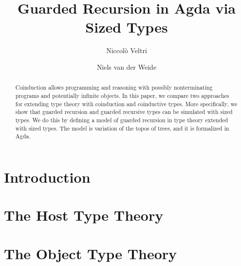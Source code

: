 \documentclass[a4paper,UKenglish,cleveref, autoref,numberwithinsect]{lipics-v2019}
\title{Guarded Recursion in Agda via Sized Types}
\author{Niccol\`o Veltri}{Department of Computer Science, IT
  University of Copenhagen, Denmark}{nive@itu.dk}{https://orcid.org/0000-0002-7230-3436}{This work was supported by a research grant (13156) from VILLUM FONDEN,
  and by DFF-Research Project 1 Grant no. 4002-00442, from The Danish Council 
  for Independent Research for the Natural Sciences (FNU).}
\author{Niels van der Weide}{Institute for Computation and Information Sciences, Radboud University, Nijmegen, The Netherlands}{nweide@cs.ru.nl}{https://orcid.org/0000-0003-1146-4161}{}
\begin{document}
\maketitle

\begin{abstract}
Coinduction allows programming and reasoning with possibly nonterminating programs and potentially infinite objects.
In this paper, we compare two approaches for extending type theory with coinduction and coinductive types.
More specifically, we show that guarded recursion and guarded recursive types can be simulated with sized types.
We do this by defining a model of guarded recursion in type theory extended with sized types.
The model is variation of the topos of trees, and it is formalized in Agda.
\end{abstract}

\section{Introduction}
\label{sec:intro}


\section{The Host Type Theory}
\label{sec:prelim}



\section{The Object Type Theory}
\label{sec:syntax}


\end{document}
